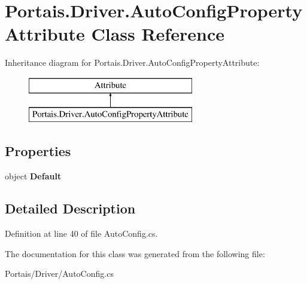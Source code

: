 \hypertarget{class_portais_1_1_driver_1_1_auto_config_property_attribute}{}\section{Portais.\+Driver.\+Auto\+Config\+Property\+Attribute Class Reference}
\label{class_portais_1_1_driver_1_1_auto_config_property_attribute}
Inheritance diagram for Portais.\+Driver.\+Auto\+Config\+Property\+Attribute\+:\begin{figure}[H]
\begin{center}
\leavevmode
\includegraphics[height=2.000000cm]{class_portais_1_1_driver_1_1_auto_config_property_attribute}
\end{center}
\end{figure}
\subsection*{Properties}
\begin{DoxyCompactItemize}
\item 
object {\bfseries Default}\hypertarget{class_portais_1_1_driver_1_1_auto_config_property_attribute_a9f0123f389eaa9a36a796e6485f192c4}{}\label{class_portais_1_1_driver_1_1_auto_config_property_attribute_a9f0123f389eaa9a36a796e6485f192c4}

\end{DoxyCompactItemize}


\subsection{Detailed Description}


Definition at line 40 of file Auto\+Config.\+cs.



The documentation for this class was generated from the following file\+:\begin{DoxyCompactItemize}
\item 
Portais/\+Driver/Auto\+Config.\+cs\end{DoxyCompactItemize}
